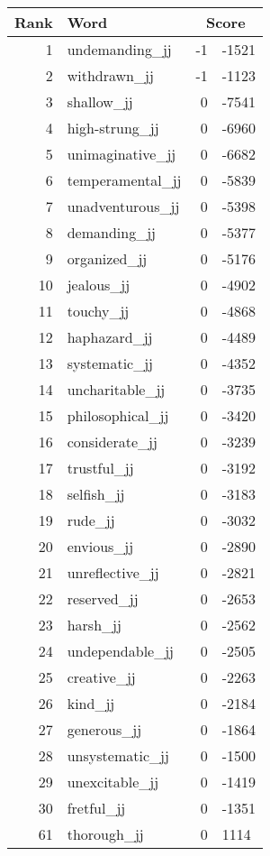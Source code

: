 \begin{longtable}[!htbp]{| rlr@{.}l |}
    \hline
    \textbf{Rank} & \textbf{Word} & \multicolumn{2}{c|}{\textbf{Score}} \\
    \hline
    \endhead
    1 & undemanding\_jj & -1 & -1521 \\
    2 & withdrawn\_jj & -1 & -1123 \\
    3 & shallow\_jj & 0 & -7541 \\
    4 & high-strung\_jj & 0 & -6960 \\
    5 & unimaginative\_jj & 0 & -6682 \\
    6 & temperamental\_jj & 0 & -5839 \\
    7 & unadventurous\_jj & 0 & -5398 \\
    8 & demanding\_jj & 0 & -5377 \\
    9 & organized\_jj & 0 & -5176 \\
    10 & jealous\_jj & 0 & -4902 \\
    11 & touchy\_jj & 0 & -4868 \\
    12 & haphazard\_jj & 0 & -4489 \\
    13 & systematic\_jj & 0 & -4352 \\
    14 & uncharitable\_jj & 0 & -3735 \\
    15 & philosophical\_jj & 0 & -3420 \\
    16 & considerate\_jj & 0 & -3239 \\
    17 & trustful\_jj & 0 & -3192 \\
    18 & selfish\_jj & 0 & -3183 \\
    19 & rude\_jj & 0 & -3032 \\
    20 & envious\_jj & 0 & -2890 \\
    21 & unreflective\_jj & 0 & -2821 \\
    22 & reserved\_jj & 0 & -2653 \\
    23 & harsh\_jj & 0 & -2562 \\
    24 & undependable\_jj & 0 & -2505 \\
    25 & creative\_jj & 0 & -2263 \\
    26 & kind\_jj & 0 & -2184 \\
    27 & generous\_jj & 0 & -1864 \\
    28 & unsystematic\_jj & 0 & -1500 \\
    29 & unexcitable\_jj & 0 & -1419 \\
    30 & fretful\_jj & 0 & -1351 \\
    61 & thorough\_jj & 0 & 1114 \\

\end{longtable}
